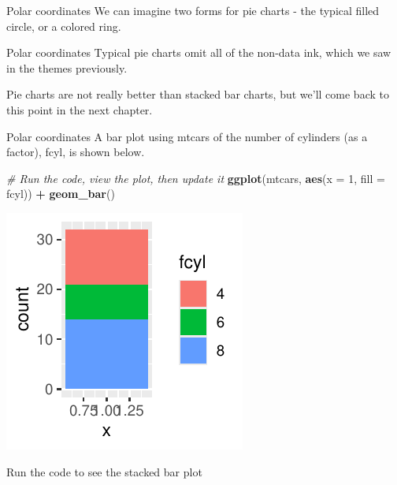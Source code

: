 \documentclass[
  ignorenonframetext,
]{beamer}
\newenvironment{Shaded}{\begin{snugshade}}{\end{snugshade}}
\newcommand{\AttributeTok}[1]{\textcolor[rgb]{0.13,0.29,0.53}{#1}}
\newcommand{\CommentTok}[1]{\textcolor[rgb]{0.56,0.35,0.01}{\textit{#1}}}
\newcommand{\DecValTok}[1]{\textcolor[rgb]{0.00,0.00,0.81}{#1}}
\newcommand{\FunctionTok}[1]{\textcolor[rgb]{0.13,0.29,0.53}{\textbf{#1}}}
\newcommand{\NormalTok}[1]{#1}
\newcommand{\SpecialCharTok}[1]{\textcolor[rgb]{0.81,0.36,0.00}{\textbf{#1}}}
\begin{document}
\begin{frame}{Polar coordinates}
\label{polar-coordinates-1}
We can imagine two forms for pie charts - the typical filled circle, or
a colored ring.
\end{frame}

\begin{frame}{Polar coordinates}
\label{polar-coordinates-2}
Typical pie charts omit all of the non-data ink, which we saw in the
themes previously.

Pie charts are not really better than stacked bar charts, but we'll come
back to this point in the next chapter.
\end{frame}

\begin{frame}[fragile]{Polar coordinates}
\label{polar-coordinates-3}
A bar plot using mtcars of the number of cylinders (as a factor), fcyl,
is shown below.


\begin{Shaded}
\begin{Highlighting}[]
\CommentTok{\# Run the code, view the plot, then update it}
\FunctionTok{ggplot}\NormalTok{(mtcars, }\FunctionTok{aes}\NormalTok{(}\AttributeTok{x =} \DecValTok{1}\NormalTok{, }\AttributeTok{fill =}\NormalTok{ fcyl)) }\SpecialCharTok{+} \FunctionTok{geom\_bar}\NormalTok{()}
\end{Highlighting}
\end{Shaded}

\begin{center}\includegraphics[width=0.5\linewidth]{Figs/unnamed-chunk-65-1} \end{center}

Run the code to see the stacked bar plot
\end{frame}
\end{document}
